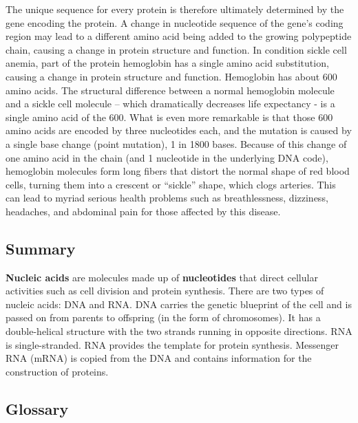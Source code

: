 \documentclass[
]{book}
\begin{document}
The unique sequence for every protein is therefore ultimately determined
by the gene encoding the protein. A change in nucleotide sequence of the
gene's coding region may lead to a different amino acid being added to
the growing polypeptide chain, causing a change in protein structure and
function. In condition sickle cell anemia, part of the protein
hemoglobin has a single amino acid substitution, causing a change in
protein structure and function. Hemoglobin has about 600 amino acids.
The structural difference between a normal hemoglobin molecule and a
sickle cell molecule -- which dramatically decreases life expectancy -
is a single amino acid of the 600. What is even more remarkable is that
those 600 amino acids are encoded by three nucleotides each, and the
mutation is caused by a single base change (point mutation), 1 in 1800
bases. Because of this change of one amino acid in the chain (and 1
nucleotide in the underlying DNA code), hemoglobin molecules form long
fibers that distort the normal shape of red blood cells, turning them
into a crescent or ``sickle'' shape, which clogs arteries. This can lead
to myriad serious health problems such as breathlessness, dizziness,
headaches, and abdominal pain for those affected by this disease.

\hypertarget{summary}{%
\subsection{Summary}\label{summary}}

\textbf{Nucleic acids} are molecules made up of \textbf{nucleotides} that direct
cellular activities such as cell division and protein synthesis. There
are two types of nucleic acids: DNA and RNA. DNA carries the genetic
blueprint of the cell and is passed on from parents to offspring (in the
form of chromosomes). It has a double-helical structure with the two
strands running in opposite directions. RNA is single-stranded. RNA
provides the template for protein synthesis. Messenger RNA (mRNA) is
copied from the DNA and contains information for the construction of
proteins.

\hypertarget{glossary}{%
\subsection{Glossary}\label{glossary}}
\end{document}

